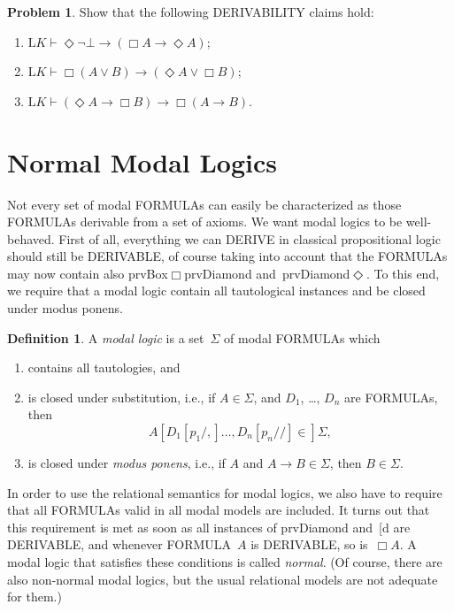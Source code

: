 \documentclass[10pt,a4paper]{article}
\makeatletter
\newcommand*{\olup}[1]{\MakeUppercase{#1}}
\theoremstyle{plain}
\theoremstyle{definition}
\newtheorem{defn}[thm]{Definition}
\newtheorem{prob}{Problem}[section]
\theoremstyle{remark}
\newcommand*{\olfileid}[3]{}
\newcommand*{\olsection}[1]{\section*{#1}}
\providecommand{\lif}{\mathbin{\rightarrow}}
\providecommand{\lfalse}{\bot}
\providecommand{\Proves}{\mathrel{\vdash}}
\providecommand{\Log}{\ensuremath{\mathrm{L}}}
\providecommand{\iftag}[1]{#1}
\providecommand{\Dual}{\mathrm{d}}
\providecommand{\Ax}{\mathrm{Ax}}
\providecommand{\SSubst}[3]{#1[#2/#3]}
\providecommand{\subst}[3]{#1[#2/#3]}
\renewcommand{\Dual}{\@ifnextchar[{\Dual@i}{\ifmmode\mathrm{d}\else$\mathrm{d}$\fi}}
\def\Dual@i[#1]{\ifmmode\mathrm{d}[#1]\else$\mathrm{d}[#1]$\fi}
\providecommand{\iftag}{}
\makeatother
\begin{document}
\begin{prob}
  Show that the following \olup{derivability} claims hold:
  \begin{enumerate}
  \item $\Log{K} \Proves \Diamond \lnot \lfalse \lif (\Box A \lif
    \Diamond A)$;
  \item $\Log{K} \Proves \Box(A \lor B) \lif (\Diamond A \lor \Box
    B)$;
  \item $\Log{K} \Proves (\Diamond A \lif \Box B) \lif \Box(A \lif
    B)$.
  \end{enumerate}
\end{prob}





\olfileid{nml}{prf}{nor}

\olsection{Normal Modal Logics}

Not every set of modal \olup{formula}s can easily be characterized as
those \olup{formula}s derivable from a set of axioms. We want modal
logics to be well-behaved. First of all, everything we can \olup{derive}
in classical propositional logic should still be \olup{derivable}, of
course taking into account that the \olup{formula}s may now contain also
\iftag{prvBox}{$\Box$\iftag{prvDiamond}{
    and~}{}}{}\iftag{prvDiamond}{$\Diamond$}{}. To this end, we
require that a modal logic contain all tautological instances and be
closed under modus ponens.

\begin{defn}
  A \emph{modal logic} is a set~$\Sigma$ of modal \olup{formula}s which
  \begin{enumerate}
  \item contains all tautologies, and
  \item is closed under substitution, i.e., if $A \in \Sigma$, and
    $D_1$, \dots, $D_n$ are \olup{formula}s, then
    \[
    \SSubst{A}{\subst{D_1}{p_1}, \dots, \subst{D_n}{p_n}} \in \Sigma,
    \]
    \item is closed under \emph{modus ponens}, i.e., if $A$ and $A
      \lif B \in \Sigma$, then $B \in \Sigma$.
  \end{enumerate}
\end{defn}

In order to use the relational semantics for modal logics, we also
have to require that all \olup{formula}s valid in all modal models are
included. It turns out that this requirement is met as soon as all
instances of \Ax{K}\iftag{prvDiamond}{ and~\Dual{}}{} are
\olup{derivable}, and whenever \olup{formula}~$A$ is \olup{derivable}, so
is~$\Box A$. A modal logic that satisfies these conditions is called
\emph{normal}. (Of course, there are also non-normal modal logics, but
the usual relational models are not adequate for them.)
\end{document}
